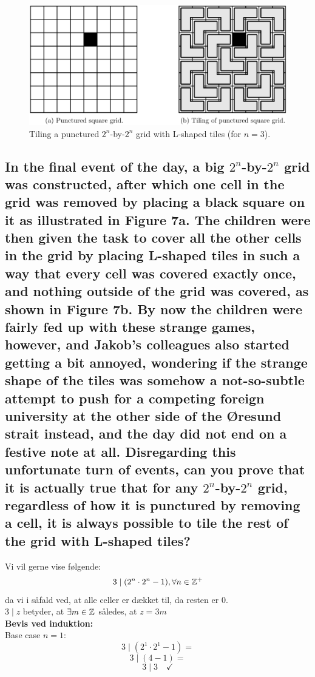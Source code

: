 \documentclass[a4paper,12pt]{article}
\begin{document}
\begin{figure}[H]
    \centering
    \includegraphics[width=1\textwidth]{figur.png}
    \caption{Tiling a punctured $2^n$-by-$2^n$ grid with L-shaped tiles (for $n = 3$).}
\end{figure}

\subsection[]{In the final event of the day, a big $2^n$-by-$2^n$ grid was constructed, after which one cell in the grid was removed by placing a black square on it as illustrated in Figure 7a. The children were then given the task to cover all the other cells in the grid by placing L-shaped tiles in such a way that every cell was covered exactly once, and nothing outside of the grid was covered, as shown in Figure 7b. By now the children were fairly fed up with these strange games, however, and Jakob’s colleagues also started getting a bit annoyed, wondering if the strange shape of the tiles was somehow a not-so-subtle attempt to push for a competing foreign university at the other side of the Øresund strait instead, and the day did not end on a festive note at all. Disregarding this unfortunate turn of events, can you prove that it is actually true that for any $2^n$-by-$2^n$ grid, regardless of how it is punctured by removing a cell, it is always possible to tile the rest of the grid with L-shaped tiles?}

Vi vil gerne vise følgende:
\[3 \mid (2^n \cdot 2^n - 1), \forall n\in \mathbb{Z}^+\]
da vi i såfald ved, at alle celler er dækket til, da resten er 0.\\
$3 \mid z$ betyder, at $\exists m\in \mathbb{Z}$ således, at $z = 3m$\\

\textbf{Bevis ved induktion:}\\
Base case $n = 1$:\\
\[3 \mid (2^1 \cdot 2^1 - 1)=\]
\[3 \mid (4 - 1)=\]
\[3 \mid 3 \quad  \checkmark\] 
\end{document}
